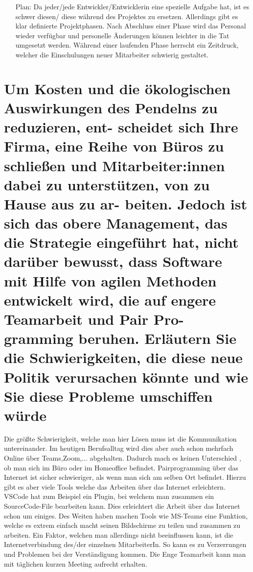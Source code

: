 \documentclass[12pt]{article}
\begin{document}
\begin{itemize}
\begin{itemize}
  \item[Plan:]Da jeder/jede Entwickler/Entwicklerin eine spezielle Aufgabe hat, ist es schwer diesen/ diese während des Projektes zu ersetzen. Allerdings gibt es klar definierte Projektphasen. Nach Abschluss einer Phase wird das Personal wieder verfügbar und personelle Änderungen können leichter in die Tat umgesetzt werden. Während einer laufenden Phase herrscht ein Zeitdruck, welcher die Einschulungen neuer Mitarbeiter schwierig gestaltet.
 \end{itemize}
\end{itemize}

\section{Um Kosten und die ökologischen Auswirkungen des Pendelns zu reduzieren, ent- scheidet sich Ihre Firma,
eine Reihe von Büros zu schließen und Mitarbeiter:innen dabei zu unterstützen, von zu Hause aus zu ar-
beiten. Jedoch ist sich das obere Management, das die Strategie eingeführt hat, nicht darüber bewusst,
dass Software mit Hilfe von agilen Methoden entwickelt wird, die auf engere Teamarbeit und Pair Pro-
gramming beruhen. Erläutern Sie die Schwierigkeiten, die diese neue Politik verursachen könnte und wie
Sie diese Probleme umschiffen würde}
Die größte Schwierigkeit, welche man hier Lösen muss ist die Kommunikation untereinander. Im heutigen Berufsalltag wird dies aber auch schon mehrfach Online über Teams,Zoom,... abgehalten. Dadurch mach es keinen Unterschied , ob man sich im Büro oder im Homeoffice befindet. Pairprogramming über das Internet ist sicher schwieriger, als wenn man sich am selben Ort befindet. Hierzu gibt es aber viele Tools welche das Arbeiten über das Internet erleichtern. VSCode hat zum Beispiel ein Plugin, bei welchem man zusammen ein SourceCode-File bearbeiten kann. Dies erleichtert die Arbeit über das Internet schon um einiges. Des Weiten haben machen Tools wie MS-Teams eine Funktion, welche es extrem einfach macht seinen Bildschirme zu teilen und zusammen zu arbeiten. Ein Faktor, welchen man allerdings nicht beeinflussen kann, ist die Internetverbindung des/der einzelnen MitarbeiterIn. So kann es zu Verzerrungen und Problemen bei der Verständigung kommen. Die Enge Teamarbeit kann man mit täglichen kurzen Meeting aufrecht erhalten.
\end{document}
